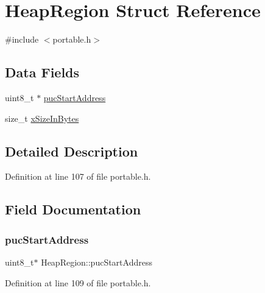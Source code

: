 \hypertarget{struct_heap_region}{}\section{Heap\+Region Struct Reference}
\label{struct_heap_region}


{\ttfamily \#include $<$portable.\+h$>$}

\subsection*{Data Fields}
\begin{DoxyCompactItemize}
\item 
uint8\+\_\+t $\ast$ \hyperlink{struct_heap_region_aab323508c34642ebfb884a68441d97fc}{puc\+Start\+Address}
\item 
size\+\_\+t \hyperlink{struct_heap_region_a5933b0fd422e70a92ceef839b89a757f}{x\+Size\+In\+Bytes}
\end{DoxyCompactItemize}


\subsection{Detailed Description}


Definition at line 107 of file portable.\+h.



\subsection{Field Documentation}
\mbox{\label{struct_heap_region_aab323508c34642ebfb884a68441d97fc}} 
\subsubsection{\texorpdfstring{puc\+Start\+Address}{pucStartAddress}}
{\footnotesize\ttfamily uint8\+\_\+t$\ast$ Heap\+Region\+::puc\+Start\+Address}



Definition at line 109 of file portable.\+h.

\mbox{\label{struct_heap_region_a5933b0fd422e70a92ceef839b89a757f}} 
